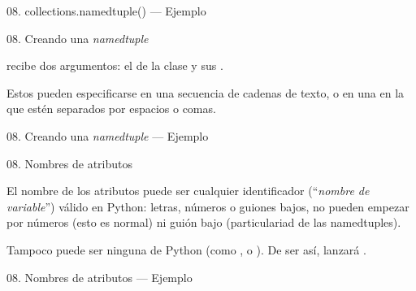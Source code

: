 \begin{frame}{08. collections.namedtuple() — Ejemplo}
  \footnotesize
\end{frame}

\begin{frame}{08. Creando una \textit{namedtuple}}
  \begin{block}{}
    \large
    \centering
     recibe dos argumentos: el
     de la clase y sus .
  \end{block}

  \begin{center}
    \small
    Estos pueden especificarse en una secuencia de cadenas de texto, o
    en una  en la que estén separados
    por espacios o comas.
  \end{center}
\end{frame}

\begin{frame}{08. Creando una \textit{namedtuple} — Ejemplo}
  \small
\end{frame}

\begin{frame}{08. Nombres de atributos}
  \begin{center}
    \small
    El nombre de los atributos puede ser cualquier identificador
    (``\textit{nombre de variable}'') válido en Python: letras,
    números o guiones bajos,  no pueden empezar por
    números (esto es normal) ni guión bajo (particulariad de las
    namedtuples).
  \end{center}

  \begin{block}{}
    \centering
    Tampoco puede ser ninguna  de Python (como
    ,  o ). De ser así,
    lanzará .
  \end{block}
\end{frame}

\begin{frame}{08. Nombres de atributos — Ejemplo}
  \footnotesize
  \scriptsize
\end{frame}

